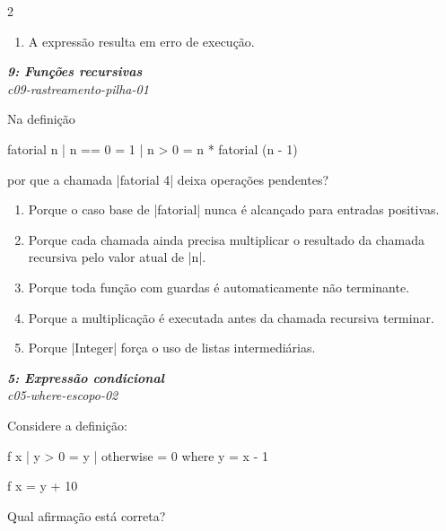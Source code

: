 \documentclass[a4paper,10pt,brazil]{article}
\begin{document}
\begin{multicols}{2}
\begin{enumerate}
  \item A expressão resulta em erro de execução.


\end{enumerate}

\begin{flushright}
  \footnotesize
  \textit{\textbf{9: Funções recursivas}}\\
  \textit{c09-rastreamento-pilha-01}\\

\end{flushright}
Na definição
\begin{haskellcode}
fatorial n
  | n == 0 = 1
  | n > 0  = n * fatorial (n - 1)
\end{haskellcode}
por que a chamada \haskellinline|fatorial 4| deixa operações pendentes?

\begin{enumerate}
  \item Porque o caso base de \haskellinline|fatorial| nunca é alcançado para entradas positivas.

  \item Porque cada chamada ainda precisa multiplicar o resultado da chamada recursiva pelo valor atual de \haskellinline|n|.

  \item Porque toda função com guardas é automaticamente não terminante.

  \item Porque a multiplicação é executada antes da chamada recursiva terminar.

  \item Porque \haskellinline|Integer| força o uso de listas intermediárias.


\end{enumerate}

\begin{flushright}
  \footnotesize
  \textit{\textbf{5: Expressão condicional}}\\
  \textit{c05-where-escopo-02}\\

\end{flushright}
Considere a definição:
\begin{haskellcode}
f x
  | y > 0     = y
  | otherwise = 0
  where y = x - 1

f x = y + 10
\end{haskellcode}
Qual afirmação está correta?


\end{multicols}
\end{document}
